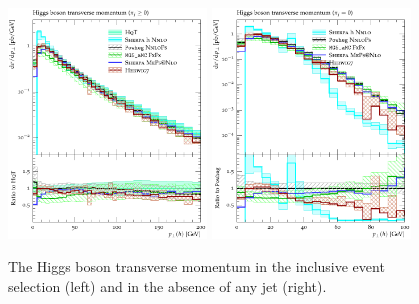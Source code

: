 \begin{figure}[t!]
  \centering
  \includegraphics[width=0.47\textwidth]{figures/hjetscomp_H_pT_incl.pdf}
  \quad
  \includegraphics[width=0.47\textwidth]{figures/hjetscomp_H_pT_excl.pdf}
  \caption{
    The Higgs boson transverse momentum in the inclusive event selection 
    (left) and in the absence of any jet (right).
    \label{fig:higgscomp:results:inclobs:hpt}
  }
\end{figure}

